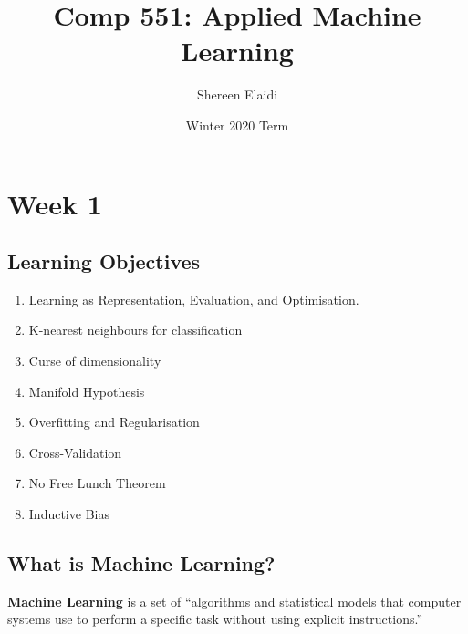 \documentclass[11pt]{scrartcl}
\title{\textbf{Comp 551: Applied Machine Learning}}
\author{Shereen Elaidi}
\date{Winter 2020 Term}
\theoremstyle{definition}
\theoremstyle{remark}
\newcommand{\dfn}[1]{\textbf{\underline{#1}}}
\begin{document}
\maketitle
\tableofcontents

\section{Week 1}
\subsection{Learning Objectives}
\begin{enumerate}[noitemsep]
	\item Learning as Representation, Evaluation, and Optimisation. 
	\item K-nearest neighbours for classification
	\item Curse of dimensionality 
	\item Manifold Hypothesis 
	\item Overfitting and Regularisation
	\item Cross-Validation
	\item No Free Lunch Theorem
	\item Inductive Bias
\end{enumerate}

\subsection{What is Machine Learning?}

\begin{center}
\dfn{Machine Learning} is a set of ``algorithms and statistical models that computer systems use to perform a specific task without using explicit instructions.'' 
\end{center} 
\end{document}
